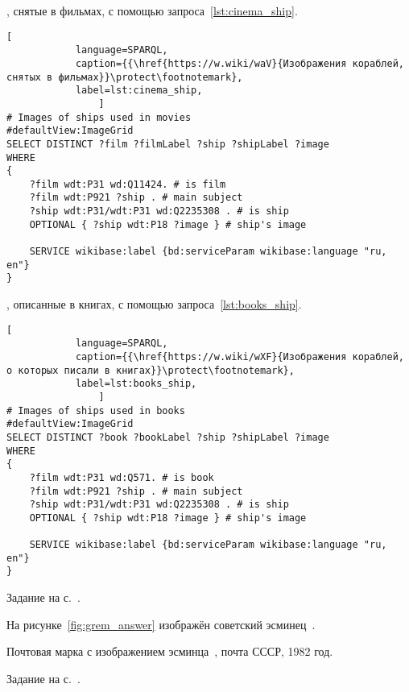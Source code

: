 \begin{task}
\label{answer:ship_1}

, снятые в фильмах, с помощью запроса~\ref{lst:cinema_ship}. 

\begin{lstlisting}[ 
            language=SPARQL, 
            caption={{\href{https://w.wiki/waV}{Изображения кораблей, снятых в фильмах}}\protect\footnotemark}, 
            label=lst:cinema_ship, 
                ]
# Images of ships used in movies
#defaultView:ImageGrid
SELECT DISTINCT ?film ?filmLabel ?ship ?shipLabel ?image
WHERE
{
	?film wdt:P31 wd:Q11424. # is film	
	?film wdt:P921 ?ship . # main subject
	?ship wdt:P31/wdt:P31 wd:Q2235308 . # is ship
	OPTIONAL { ?ship wdt:P18 ?image } # ship's image
								
	SERVICE wikibase:label {bd:serviceParam wikibase:language "ru, en"}
}
\end{lstlisting}



, описанные в книгах, с помощью запроса~\ref{lst:books_ship}. 
\begin{lstlisting}[ 
            language=SPARQL, 
            caption={{\href{https://w.wiki/wXF}{Изображения кораблей, о которых писали в книгах}}\protect\footnotemark}, 
            label=lst:books_ship, 
                ]
# Images of ships used in books
#defaultView:ImageGrid
SELECT DISTINCT ?book ?bookLabel ?ship ?shipLabel ?image
WHERE
{
	?film wdt:P31 wd:Q571. # is book	
	?film wdt:P921 ?ship . # main subject
	?ship wdt:P31/wdt:P31 wd:Q2235308 . # is ship
	OPTIONAL { ?ship wdt:P18 ?image } # ship's image
									
	SERVICE wikibase:label {bd:serviceParam wikibase:language "ru, en"}
}
\end{lstlisting}
	
\small{Задание на с.~\pageref{question:ship_1}.}
\end{task}





\newpage
\begin{task}
На рисунке~\ref{fig:grem_answer} изображён советский эсминец~.

\label{answer:ship_2}
\begin{marginfigure}[0.0cm]
		{
		  \setlength{\fboxsep}{0pt}%
		  \setlength{\fboxrule}{1pt}%
		}
        \caption[Эсминец <<Гремящий>>.]{Почтовая марка с изображением эсминца~, почта СССР, 1982 год.}%
		\label{fig:grem_answer}%
	  \end{marginfigure}

\small{Задание на с.~\pageref{question:ship_2}.}
\end{task}



